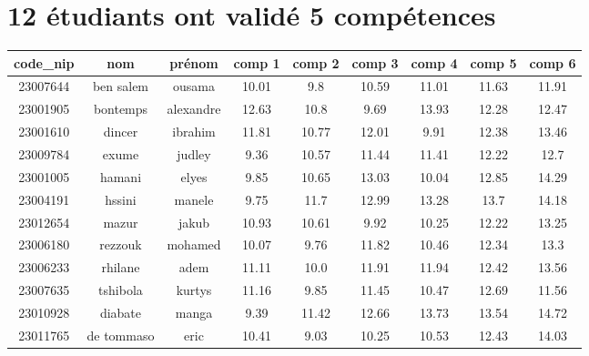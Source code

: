 \documentclass{article}%
\begin{document}
\section{12 étudiants ont validé 5 compétences}%
\label{sec:12tudiantsontvalid5comptences}%
\begin{tabular}{|c|c|c|c|c|c|c|c|c|}%
\hline%
code\_nip&nom&prénom&comp 1&comp 2&comp 3&comp 4&comp 5&comp 6\\%
\hline%
23007644&ben salem&ousama&10.01&9.8&10.59&11.01&11.63&11.91\\%
\hline%
23001905&bontemps&alexandre&12.63&10.8&9.69&13.93&12.28&12.47\\%
\hline%
23001610&dincer&ibrahim&11.81&10.77&12.01&9.91&12.38&13.46\\%
\hline%
23009784&exume&judley&9.36&10.57&11.44&11.41&12.22&12.7\\%
\hline%
23001005&hamani&elyes&9.85&10.65&13.03&10.04&12.85&14.29\\%
\hline%
23004191&hssini&manele&9.75&11.7&12.99&13.28&13.7&14.18\\%
\hline%
23012654&mazur&jakub&10.93&10.61&9.92&10.25&12.22&13.25\\%
\hline%
23006180&rezzouk&mohamed&10.07&9.76&11.82&10.46&12.34&13.3\\%
\hline%
23006233&rhilane&adem&11.11&10.0&11.91&11.94&12.42&13.56\\%
\hline%
23007635&tshibola&kurtys&11.16&9.85&11.45&10.47&12.69&11.56\\%
\hline%
23010928&diabate&manga&9.39&11.42&12.66&13.73&13.54&14.72\\%
\hline%
23011765&de tommaso&eric&10.41&9.03&10.25&10.53&12.43&14.03\\%
\hline%
\end{tabular}

%
\end{document}
